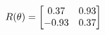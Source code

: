 \documentclass[preview]{standalone}
\begin{document}
\begin{align*}
\special{dvisvgm:raw <g id='unique000'>}R(\theta) = \begin{bmatrix}0.37 & 0.93\\-0.93 & 0.37\end{bmatrix}\special{dvisvgm:raw </g>}
\end{align*}
\end{document}
